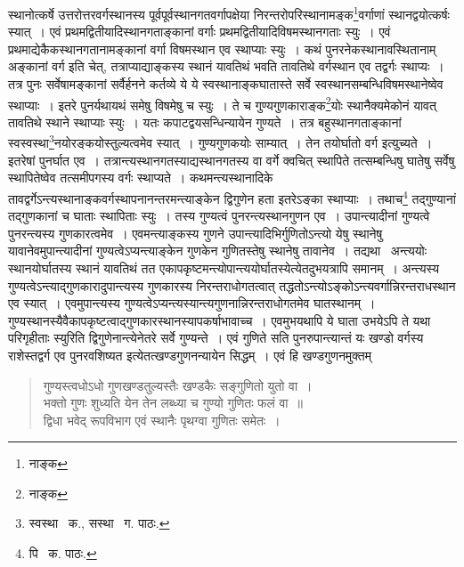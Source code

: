 \documentclass[11pt, openany]{book}
\begin{document}
{\noindent स्थानोत्कर्षे उत्तरोत्तरवर्गस्थानस्य पूर्वपूर्वस्थानगतवर्गापक्षेया निरन्तरोपरिस्थानामङ्क\renewcommand{\thefootnote}{१}\footnote{नाङ्क}वर्गाणां स्थानद्वयोत्कर्षः स्यात्~। एवं
प्रथमद्वितीयादिस्थानगताङ्कानां वर्गाः प्रथमद्वितीयादिविषमस्थानगताः स्युः~। एवं प्रथमाद्येकैकस्थानगतानामङ्कानां वर्गा विषमस्थान एव स्थाप्याः स्युः~। कथं पुनरनेकस्थानावस्थितानाम् अङ्कानां वर्ग इति चेत्, तत्राप्याद्याङ्कस्य स्थानं यावतिथं भवति तावतिथे वर्गस्थान एव तद्वर्गः स्थाप्यः~। तत्र पुनः सर्वेषामङ्कानां सर्वैर्हनने कर्तव्ये ये ये स्वस्थानाङ्कघातास्ते सर्वे स्वस्थानसम्बन्धिविषमस्थानेष्वेव
स्थाप्याः~। इतरे पुनर्यथायथं समेषु विषमेषु च स्युः~। ते च गुण्यगुणकाराङ्क\renewcommand{\thefootnote}{२}\footnote{नाङ्क }योः स्थानैक्यमेकोनं यावत् तावतिथे स्थाने स्थाप्याः स्युः~। यतः कपाटद्वयसन्धिन्यायेन गुण्यते~। तत्र बहुस्थानगताङ्कानां स्वस्वस्था\renewcommand{\thefootnote}{३}\footnote{स्वस्था \textendash\ क., सस्था \textendash\ ग. पाठः.}नयोरङ्कयोस्तुल्यत्वमेव स्यात्~। गुण्यगुणकयोः साम्यात्~। तेन तयोर्घातो वर्ग इत्युच्यते~। इतरेषां पुनर्घात एव~। तत्रान्त्यस्थानगतस्याद्यस्थानगतस्य वा वर्गे क्वचित् स्थापिते तत्सम्बन्धिषु घातेषु सर्वेषु स्थापितेष्वेव तत्समीपगस्य वर्गः स्थाप्यते~। कथमन्त्यस्थानादिके तावद्वर्गेऽन्त्यस्थानाङ्कवर्गस्थापनानन्तरमन्त्याङ्केन
द्विगुणेन हता इतरेऽङ्का स्थाप्याः~। तथाच\renewcommand{\thefootnote}{४}\footnote{पि \textendash\ क. पाठः.} तद्गुण्यानां तद्गुणकानां च घाताः स्थापिताः स्युः~। तस्य गुण्यत्वं पुनरन्त्यस्थानगुणन एव~। उपान्त्यादीनां गुण्यत्वे पुनरन्त्यस्य गुणकारत्वमेव~। एवमन्त्याङ्कस्य गुणने उपान्त्यादिभिर्गुणितोऽन्त्यो येषु स्थानेषु यावानेवमुपान्त्यादीनां गुण्यत्वेऽप्यन्त्याङ्केन गुणकेन गुणितस्तेषु स्थानेषु तावानेव~। तद्यथा \textendash\ अन्त्ययोः स्थानयोर्घातस्य स्थानं यावतिथं तत एकापकृष्टमन्त्योपान्त्ययोर्घातस्येत्येतदुभयत्रापि समानम्~। अन्त्यस्य गुण्यत्वेऽन्त्याद्गुणकारादुपान्त्यस्य गुणकारस्य
निरन्तराधोगतत्वात् तद्धतोऽन्त्योऽङ्कोऽन्त्यवर्गान्निरन्तराधस्थान एव स्यात्~। एवमुपान्त्यस्य गुण्यत्वेऽप्यन्त्यस्यान्त्यगुणनान्निरन्तराधोगतमेव घातस्थानम्~। गुण्यस्थानस्यैवैकापकृष्टत्वाद्गुणकारस्थानस्यापकर्षाभावाच्च~। एवमुभयथापि ये घाता उभयेऽपि ते यथा परिगृहीताः स्युरिति द्विगुणेनान्त्येनेतरे सर्वे गुण्यन्ते~। एवं गुणिते सति पुनरुपान्त्यान्तं यः खण्डो वर्गस्य राशेस्तद्वर्ग एव
पुनरवशिष्यत इत्येतत्खण्डगुणनन्यायेन सिद्धम्~। एवं हि खण्डगुणनमुक्तम्\textendash 

\newpage

\begin{quote}
{\qt गुण्यस्त्वधोऽधो गुणखण्डतुल्यस्तैः खण्डकैः सङ्गुणितो युतो वा~।\\
भक्तो गुणः शुध्यति येन तेन लब्ध्या च गुण्यो गुणितः फलं वा~॥\\
द्विधा भवेद् रूपविभाग एवं स्थानैः पृथग्वा गुणितः समेतः~।}
\end{quote}

}
\end{document}
